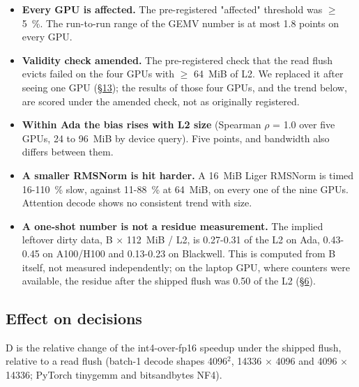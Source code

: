 \documentclass[11pt,a4paper]{article}
\providecommand{\tightlist}{\setlength{\itemsep}{0pt}\setlength{\parskip}{0pt}}
\begin{document}
\begin{itemize}
\tightlist
\item
  \textbf{Every GPU is affected.} The pre-registered "affected" threshold was \ensuremath{\ge} 5~\%. The run-to-run range of the
  GEMV number is at most 1.8 points on every GPU.
\item
  \textbf{Validity check amended.} The pre-registered check that the read flush evicts failed on the four GPUs with
  \ensuremath{\ge} 64~MiB of L2. We replaced it after seeing one GPU (\hyperref[negative-results-deviations-and-limitations]{\S{}13}); the results of those four GPUs, and the trend below,
  are scored under the amended check, not as originally registered.
\item
  \textbf{Within Ada the bias rises with L2 size} (Spearman \ensuremath{\rho} = 1.0 over five GPUs, 24 to 96~MiB by device query). Five
  points, and bandwidth also differs between them.
\item
  \textbf{A smaller RMSNorm is hit harder.} A 16~MiB Liger RMSNorm is timed 16-110~\% slow, against 11-88~\% at 64~MiB,
  on every one of the nine GPUs. Attention decode shows no consistent trend with size.
\item
  \textbf{A one-shot number is not a residue measurement.} The implied leftover dirty data, B \ensuremath{\times} 112~MiB / L2, is
  0.27-0.31 of the L2 on Ada, 0.43-0.45 on A100/H100 and 0.13-0.23 on Blackwell. This is computed from B itself, not measured
  independently; on the laptop GPU, where counters were available, the residue after the shipped flush was
  0.50 of the L2 (\hyperref[what-removes-the-residue-and-what-does-not]{\S{}6}).
\end{itemize}

\subsection{Effect on decisions}\label{effect-on-decisions}

D is the relative change of the int4-over-fp16 speedup under the shipped flush, relative to a read flush (batch-1
decode shapes 4096\ensuremath{^2}, 14336 \ensuremath{\times} 4096 and 4096 \ensuremath{\times} 14336; PyTorch tinygemm and bitsandbytes NF4).
\end{document}

